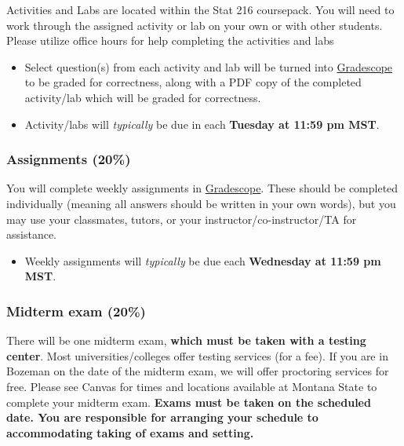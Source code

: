 \documentclass[
]{article}
\providecommand{\tightlist}{%
  \setlength{\itemsep}{0pt}\setlength{\parskip}{0pt}}
\begin{document}
Activities and Labs are located within the Stat 216 coursepack. You will
need to work through the assigned activity or lab on your own or with
other students. Please utilize office hours for help completing the
activities and labs

\begin{itemize}
\tightlist
\item
  Select question(s) from each activity and lab will be turned into
  \href{https://www.gradescope.com/}{Gradescope} to be graded for
  correctness, along with a PDF copy of the completed activity/lab which
  will be graded for correctness.
\item
  Activity/labs will \emph{typically} be due in each \textbf{Tuesday at
  11:59 pm MST}.
\end{itemize}

\subsubsection{Assignments (20\%)}\label{assignments-20}

You will complete weekly assignments in
\href{https://www.gradescope.com/}{Gradescope}. These should be
completed individually (meaning all answers should be written in your
own words), but you may use your classmates, tutors, or your
instructor/co-instructor/TA for assistance.

\begin{itemize}
\tightlist
\item
  Weekly assignments will \emph{typically} be due each \textbf{Wednesday
  at 11:59 pm MST}.
\end{itemize}

\subsubsection{Midterm exam (20\%)}\label{midterm-exam-20}

There will be one midterm exam, \textbf{which must be taken with a
testing center}. Most universities/colleges offer testing services (for
a fee). If you are in Bozeman on the date of the midterm exam, we will
offer proctoring services for free. Please see Canvas for times and
locations available at Montana State to complete your midterm exam.
\textbf{Exams must be taken on the scheduled date. You are responsible
for arranging your schedule to accommodating taking of exams and
setting.}
\end{document}
